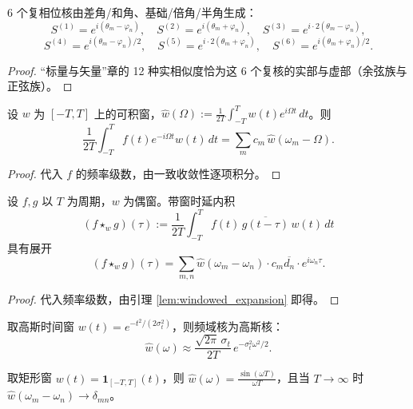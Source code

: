 \begin{proposition}[6 个复相位核]\label{prop:six_complex_kernels}
6 个复相位核由差角/和角、基础/倍角/半角生成：
\[
S^{(1)} = e^{i(\theta_m - \varphi_n)}, \quad S^{(2)} = e^{i(\theta_m + \varphi_n)}, \quad S^{(3)} = e^{i \cdot 2(\theta_m - \varphi_n)},
\]
\[
S^{(4)} = e^{i(\theta_m - \varphi_n)/2}, \quad S^{(5)} = e^{i \cdot 2(\theta_m + \varphi_n)}, \quad S^{(6)} = e^{i(\theta_m + \varphi_n)/2}.
\]
\end{proposition}

\begin{proof}
“标量与矢量”章的 12 种实相似度恰为这 6 个复核的实部与虚部（余弦族与正弦族）。
\end{proof}

\begin{lemma}[带窗展开]\label{lem:windowed_expansion}
设 $w$ 为 $[-T, T]$ 上的可积窗，$\widehat{w}(\Omega) := \frac{1}{2T} \int_{-T}^{T} w(t) e^{i\Omega t}\,dt$。则
\[
\frac{1}{2T}\int_{-T}^{T} f(t) e^{-i\Omega t} w(t)\,dt = \sum_{m} c_m\, \widehat{w}(\omega_m - \Omega).
\]
\end{lemma}

\begin{proof}
代入 $f$ 的频率级数，由一致收敛性逐项积分。
\end{proof}

\begin{theorem}[窗-核对偶定理]\label{thm:window_kernel_duality}
设 $f, g$ 以 $T$ 为周期，$w$ 为偶窗。带窗时延内积
\[
(f \star_w g)(\tau) := \frac{1}{2T}\int_{-T}^{T} f(t)\, \overline{g(t - \tau)}\, w(t)\,dt
\]
具有展开
\[
(f \star_w g)(\tau) = \sum_{m,n} \widehat{w}(\omega_m - \omega_n) \cdot c_m \overline{d_n} \cdot e^{i\omega_n \tau}.
\]
\end{theorem}

\begin{proof}
代入频率级数，由引理 \ref{lem:windowed_expansion} 即得。
\end{proof}

\begin{corollary}[高斯窗与高斯核]\label{cor:gaussian_window_kernel}
取高斯时间窗 $w(t) = e^{-t^2/(2\sigma_t^2)}$，则频域核为高斯核：
\[
\widehat{w}(\omega) \approx \frac{\sqrt{2\pi}\,\sigma_t}{2T}\, e^{-\sigma_t^2 \omega^2 / 2}.
\]
\end{corollary}

\begin{corollary}\label{cor:classical_limit}
取矩形窗 $w(t) = \mathbf{1}_{[-T,T]}(t)$，则 $\widehat{w}(\omega) = \frac{\sin(\omega T)}{\omega T}$，且当 $T \to \infty$ 时 $\widehat{w}(\omega_m - \omega_n) \to \delta_{mn}$。
\end{corollary}

